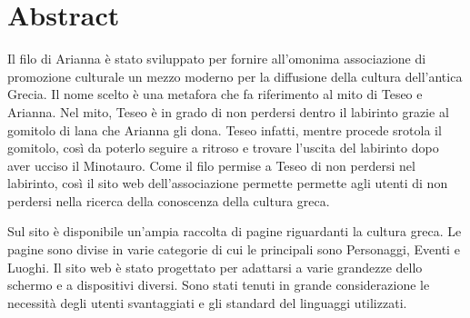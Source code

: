 \section*{Abstract}

Il filo di Arianna è stato sviluppato per fornire all'omonima associazione di promozione culturale un mezzo moderno per la diffusione della cultura dell'antica Grecia.
Il nome scelto è una metafora che fa riferimento al mito di Teseo e Arianna.
Nel mito, Teseo è in grado di non perdersi dentro il labirinto grazie al gomitolo di lana che Arianna gli dona. Teseo infatti, mentre procede srotola il gomitolo, così da poterlo seguire a ritroso e trovare l'uscita del labirinto dopo aver ucciso il Minotauro.
Come il filo permise a Teseo di non perdersi nel labirinto, così il sito web dell'associazione permette permette agli utenti di non perdersi nella ricerca della conoscenza della cultura greca.

Sul sito è disponibile un'ampia raccolta di pagine riguardanti la cultura greca. 
Le pagine sono divise in varie categorie di cui le principali sono Personaggi, Eventi e Luoghi.
Il sito web è stato progettato per adattarsi a varie grandezze dello schermo e a dispositivi diversi.
Sono stati tenuti in grande considerazione le necessità degli utenti svantaggiati e gli standard del linguaggi utilizzati.
